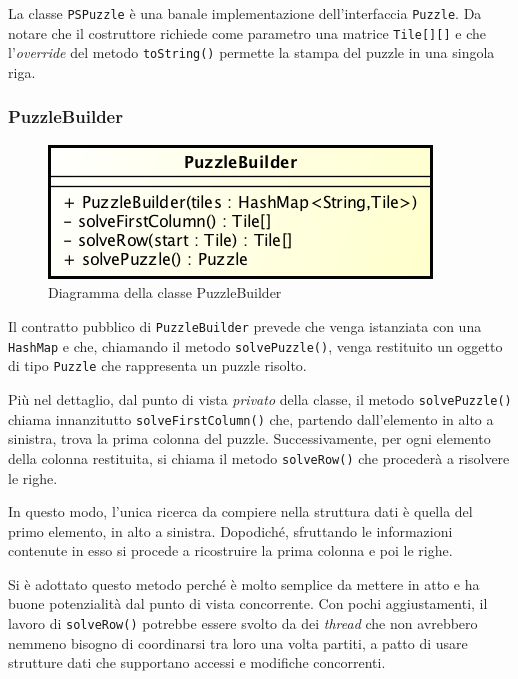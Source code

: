\documentclass[a4paper, 12pt]{article}
\begin{document}
        La classe \verb|PSPuzzle| è una banale implementazione dell'interfaccia \verb|Puzzle|. Da notare che il costruttore richiede come parametro una matrice \verb|Tile[][]| e che l'\emph{override} del metodo \verb|toString()| permette la stampa del puzzle in una singola riga.    

      \subsubsection{PuzzleBuilder}

        \begin{figure}[H]

          \centering
          \includegraphics[scale=0.7]{uml/puzzlebuilder.png}
          \caption{Diagramma della classe PuzzleBuilder}
          \label{uml:puzzlebuilder}

        \end{figure}

        Il contratto pubblico di \verb|PuzzleBuilder| prevede che venga istanziata con una \verb|HashMap| e che, chiamando il metodo \verb|solvePuzzle()|, venga restituito un oggetto di tipo \verb|Puzzle| che rappresenta un puzzle risolto.

        Più nel dettaglio, dal punto di vista \emph{privato} della classe, il metodo \verb|solvePuzzle()| chiama innanzitutto \verb|solveFirstColumn()| che, partendo dall'elemento in alto a sinistra, trova la prima colonna del puzzle. Successivamente, per ogni elemento della colonna restituita, si chiama il metodo \verb|solveRow()| che procederà a risolvere le righe.

        In questo modo, l'unica ricerca da compiere nella struttura dati è quella del primo elemento, in alto a sinistra. Dopodiché, sfruttando le informazioni contenute in esso si procede a ricostruire la prima colonna e poi le righe.

        Si è adottato questo metodo perché è molto semplice da mettere in atto e ha buone potenzialità dal punto di vista concorrente. Con pochi aggiustamenti, il lavoro di \verb|solveRow()| potrebbe essere svolto da dei \emph{thread} che non avrebbero nemmeno bisogno di coordinarsi tra loro una volta partiti, a patto di usare strutture dati che supportano accessi e modifiche concorrenti.
\end{document}
